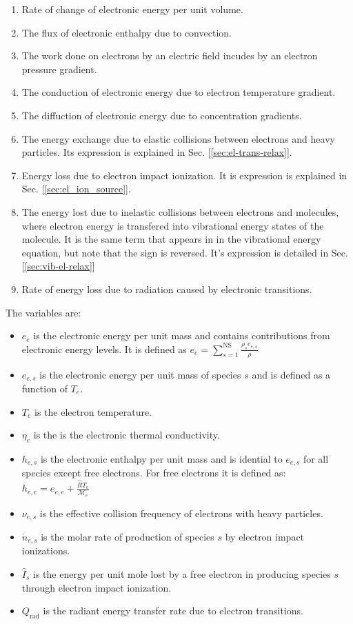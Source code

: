 \documentclass[10pt]{article}
\begin{document}
\begin{flushleft}
\begin{enumerate}
    \item Rate of change of electronic energy per unit volume.
    \item The flux of electronic enthalpy due to convection.
    \item The work done on electrons by an electric field incudes by an electron pressure gradient.
    \item The conduction of electronic energy due to electron temperature gradient.
    \item The diffuction of electronic energy due to concentration gradients.
    \item The energy exchange due to elastic collisions between electrons and heavy particles. Its expression is explained in Sec. [\ref{sec:el-trans-relax}].
    \item Energy loss due to electron impact ionization. It is expression is explained in Sec. [\ref{sec:el_ion_source}].
    \item The energy lost due to inelastic collisions between electrons and molecules, where electron energy is transfered into vibrational energy states of the molecule. It is the same term that appears in in the vibrational energy equation, but note that the sign is reversed. It's expression is detailed in Sec. [\ref{sec:vib-el-relax}]
    \item Rate of energy loss due to radiation caused by electronic transitions.
\end{enumerate}

The variables are:
\begin{itemize}
    \item $e_e$ is the electronic energy per unit mass and contains contributions from electronic energy levels. It is defined as $\displaystyle e_e = \sum_{s=1}^\text{NS} \frac{\rho_s e_{e,s}}{\rho}$
    \item  $e_{e,s}$ is the electronic energy per unit mass of species $s$ and is defined as a function of $T_e$.
    \item $T_e$ is the electron temperature.
    \item $\eta_e$ is the is the electronic thermal conductivity.
    \item $h_{e,s}$ is the electronic enthalpy per unit mass and is idential to $e_{e,s}$ for all species except free electrons. For free electrons it is defined as: $ \displaystyle h_{e,e} = e_{e,e} + \frac{\hat{R}T_e}{\mathcal{M}_e}$
    \item $\nu_{e,s}$ is the effective collision frequency of electrons with heavy particles.
    \item $\dot{n}_{e,s}$ is the molar rate of production of species $s$ by electron impact ionizations.
    \item $\hat{I}_s$ is the energy per unit mole lost by a free electron in producing species $s$ through electron impact ionization.
    \item $Q_\text{rad}$ is the radiant energy transfer rate due to electron transitions.
\end{itemize}


\end{flushleft}
\end{document}
